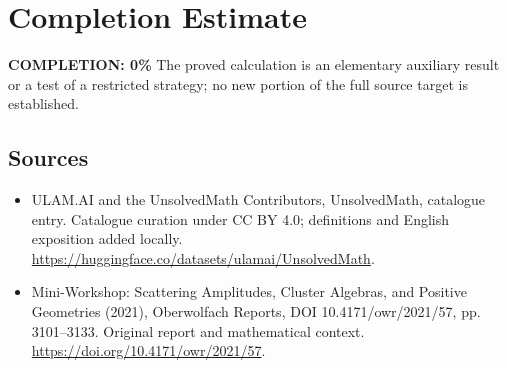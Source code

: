 \documentclass[11pt]{article}
\begin{document}
\section{Completion Estimate}
\noindent\textbf{COMPLETION: 0\%}
The proved calculation is an elementary auxiliary result or a test of a restricted strategy; no new portion of the full source target is established.

\subsection{Sources}
\begin{itemize}
\item[\hypertarget{source:statement:1}{S1}] ULAM.AI and the UnsolvedMath Contributors, UnsolvedMath, catalogue entry. Catalogue curation under CC BY 4.0; definitions and English exposition added locally.
\url{https://huggingface.co/datasets/ulamai/UnsolvedMath}.
\item[\hypertarget{source:statement:2}{S2}] Mini-Workshop: Scattering Amplitudes, Cluster Algebras, and Positive Geometries (2021), Oberwolfach Reports, DOI 10.4171/owr/2021/57, pp. 3101--3133. Original report and mathematical context.
\url{https://doi.org/10.4171/owr/2021/57}.
\end{itemize}
\label{end:statement}
\end{document}
